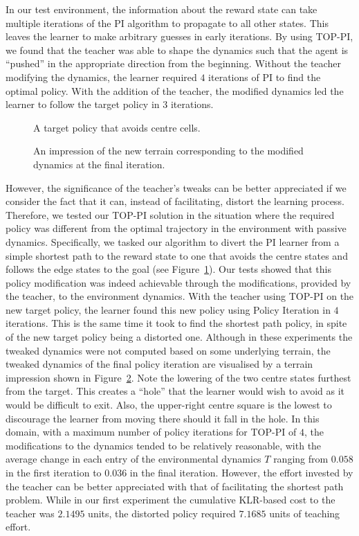 In our test environment, the information about the reward state can
take multiple iterations of the PI algorithm to propagate to all other
states.  This leaves the learner to make arbitrary guesses in early
iterations.  By using TOP-PI, we found that the teacher was able to
shape the dynamics such that the agent is ``pushed'' in the
appropriate direction from the beginning.  Without the teacher
modifying the dynamics, the learner required $4$ iterations of PI to
find the optimal policy.  With the addition of the teacher, the
modified dynamics led the learner to follow the target policy in $3$
iterations.

\begin{figure}[ht]
\centerline{}
\caption{\label{newopt}A target policy that avoids centre cells.}
\end{figure}

\begin{figure}[ht]
\centerline{}
\caption{\label{newalt}An impression of the new terrain corresponding to the modified dynamics at the final iteration.}
\end{figure}

However, the significance of the teacher's tweaks can be better
appreciated if we consider the fact that it can, instead of
facilitating, distort the learning process. Therefore, we tested our
TOP-PI solution in the situation where the required policy was
different from the optimal trajectory in the environment with passive
dynamics. Specifically, we tasked our algorithm to divert the PI
learner from a simple shortest path to the reward state to one that
avoids the centre states and follows the edge states to the goal (see
Figure~\ref{newopt}).  Our tests showed that this policy modification
was indeed achievable through the modifications, provided by the
teacher, to the environment dynamics.  With the teacher using TOP-PI
on the new target policy, the learner found this new policy using
Policy Iteration in $4$ iterations. This is the same time it took to
find the shortest path policy, in spite of the new target policy being
a distorted one.  Although in these experiments the tweaked dynamics
were not computed based on some underlying terrain, the tweaked
dynamics of the final policy iteration are visualised by a terrain
impression shown in Figure~\ref{newalt}.  Note the lowering of the two
centre states furthest from the target.  This creates a ``hole'' that
the learner would wish to avoid as it would be difficult to exit.
Also, the upper-right centre square is the lowest to discourage the
learner from moving there should it fall in the hole. In this domain,
with a maximum number of policy iterations for TOP-PI of $4$, the
modifications to the dynamics tended to be relatively reasonable, with
the average change in each entry of the environmental dynamics $T$
ranging from $0.058$ in the first iteration to $0.036$ in the final
iteration. However, the effort invested by the teacher can be better
appreciated with that of facilitating the shortest path
problem. While in our first experiment the cumulative KLR-based cost
to the teacher was $2.1495$ units, the distorted policy required
$7.1685$ units of teaching effort.

